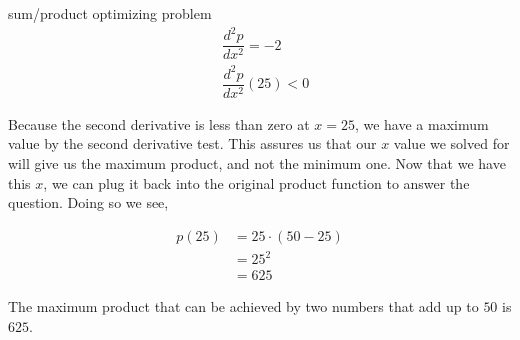 \begin{examplebreak}{sum/product optimizing problem}
    \begin{align}
        &\dfrac{d^2p}{dx^2} = -2 \\
        &\dfrac{d^2p}{dx^2} \left( 25 \right) < 0
    \end{align}
    
    Because the second derivative is less than zero at \( x = 25 \), we have a maximum value by the second derivative test. This assures us that our \( x \) value we solved for will give us the maximum product, and not the minimum one. Now that we have this \( x \), we can plug it back into the original product function to answer the question. Doing so we see,
    
    \begin{align}
        p \left( 25 \right) &= 25 \cdot \left( 50 - 25 \right) \\
        &= 25^2 \\
        &= 625
    \end{align}
    
    The maximum product that can be achieved by two numbers that add up to \( 50 \) is \( 625 \).
\end{examplebreak}

